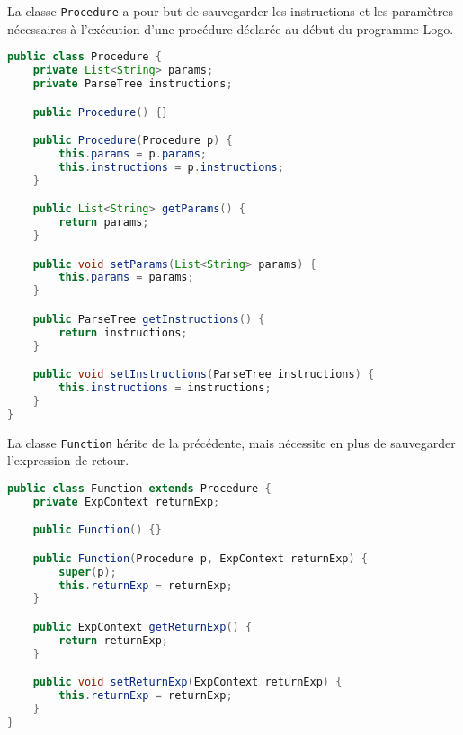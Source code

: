\documentclass[a4paper,11pt]{article}
\begin{document}
La classe \lstinline$Procedure$ a pour but de sauvegarder les instructions et les paramètres nécessaires à l’exécution d'une procédure déclarée au début du programme Logo.
\begin{lstlisting}[language=Java]
public class Procedure {
    private List<String> params;
    private ParseTree instructions;

    public Procedure() {}

    public Procedure(Procedure p) {
        this.params = p.params;
        this.instructions = p.instructions;
    }

    public List<String> getParams() {
        return params;
    }

    public void setParams(List<String> params) {
        this.params = params;
    }

    public ParseTree getInstructions() {
        return instructions;
    }

    public void setInstructions(ParseTree instructions) {
        this.instructions = instructions;
    }
}
\end{lstlisting}

La classe \lstinline$Function$ hérite de la précédente, mais nécessite en plus de sauvegarder l'expression de retour.
\begin{lstlisting}[language=Java]
public class Function extends Procedure {
    private ExpContext returnExp;

    public Function() {}

    public Function(Procedure p, ExpContext returnExp) {
        super(p);
        this.returnExp = returnExp;
    }

    public ExpContext getReturnExp() {
        return returnExp;
    }

    public void setReturnExp(ExpContext returnExp) {
        this.returnExp = returnExp;
    }
}
\end{lstlisting}
\end{document}
